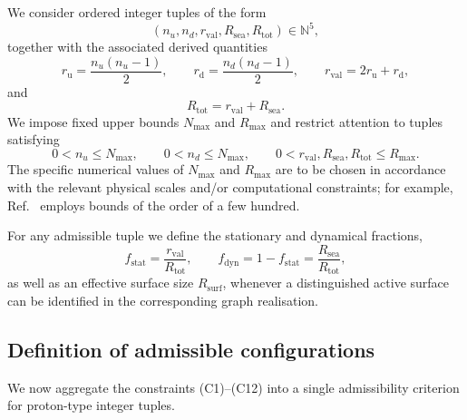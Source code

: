 \documentclass[11pt,a4paper]{article}
\theoremstyle{definition}
\begin{document}
We consider ordered integer tuples of the form
\[
 (n_u,n_d,r_{\mathrm{val}},R_{\mathrm{sea}},R_{\mathrm{tot}})\in \mathbb{N}^5,
\]
together with the associated derived quantities
\[
 r_{\mathrm{u}} = \frac{n_u(n_u-1)}{2}, \qquad
 r_{\mathrm{d}} = \frac{n_d(n_d-1)}{2}, \qquad
 r_{\mathrm{val}} = 2r_{\mathrm{u}} + r_{\mathrm{d}},
\]
and
\[
 R_{\mathrm{tot}} = r_{\mathrm{val}} + R_{\mathrm{sea}}.
\]
We impose fixed upper bounds $N_{\max}$ and $R_{\max}$ and restrict attention to tuples satisfying
\[
 0 < n_u \leq N_{\max}, \qquad 0 < n_d \leq N_{\max}, \qquad
 0 < r_{\mathrm{val}},R_{\mathrm{sea}},R_{\mathrm{tot}} \leq R_{\max}.
\]
The specific numerical values of $N_{\max}$ and $R_{\max}$ are to be chosen in accordance with the relevant physical scales and/or computational constraints; for example, Ref.~\cite{Combinatorial_Proton_v2_2026} employs bounds of the order of a few hundred.\cite{Combinatorial_Proton_v2_2026}

For any admissible tuple we define the stationary and dynamical fractions,
\[
 f_{\mathrm{stat}} = \frac{r_{\mathrm{val}}}{R_{\mathrm{tot}}}, \qquad
 f_{\mathrm{dyn}} = 1 - f_{\mathrm{stat}} = \frac{R_{\mathrm{sea}}}{R_{\mathrm{tot}}},
\]
as well as an effective surface size $R_{\mathrm{surf}}$, whenever a distinguished active surface can be identified in the corresponding graph realisation.\cite{Combinatorial_Proton_v2_2026,Effective_Fields_PDL_2026}

\subsection{Definition of admissible configurations}

We now aggregate the constraints (C1)–(C12) into a single admissibility criterion for proton-type integer tuples.
\end{document}

